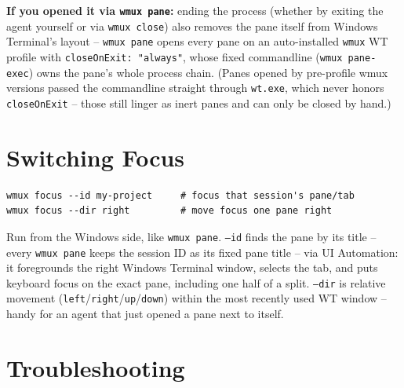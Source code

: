 \documentclass{article}
\begin{document}
\textbf{If you opened it via \texttt{wmux pane}:} ending the process (whether by exiting the agent yourself or via \texttt{wmux close}) also removes the pane itself from Windows Terminal's layout -- \texttt{wmux pane} opens every pane on an auto-installed \texttt{wmux} WT profile with \texttt{closeOnExit: "always"}, whose fixed commandline (\texttt{wmux pane-exec}) owns the pane's whole process chain. (Panes opened by pre-profile wmux versions passed the commandline straight through \texttt{wt.exe}, which never honors \texttt{closeOnExit} -- those still linger as inert panes and can only be closed by hand.)

\section{Switching Focus}

\begin{lstlisting}
wmux focus --id my-project     # focus that session's pane/tab
wmux focus --dir right         # move focus one pane right
\end{lstlisting}

Run from the Windows side, like \texttt{wmux pane}. \texttt{--id} finds the pane by its title -- every \texttt{wmux pane} keeps the session ID as its fixed pane title -- via UI Automation: it foregrounds the right Windows Terminal window, selects the tab, and puts keyboard focus on the exact pane, including one half of a split. \texttt{--dir} is relative movement (\texttt{left}/\texttt{right}/\texttt{up}/\texttt{down}) within the most recently used WT window -- handy for an agent that just opened a pane next to itself.

\section{Troubleshooting}
\end{document}
